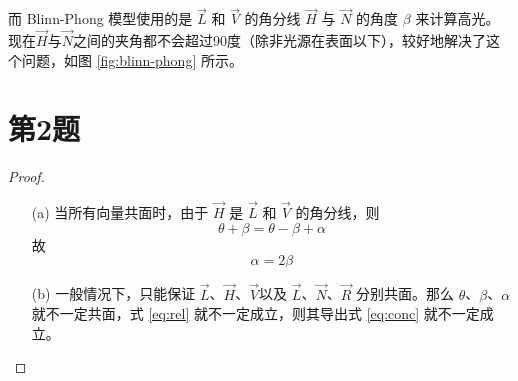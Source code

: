 \documentclass[math-font=newcm]{sjtuarticle}
\begin{document}
而 Blinn-Phong 模型使用的是 $\overrightarrow{L}$ 和 $\overrightarrow{V}$ 的角分线 $\overrightarrow{H}$ 与 $\overrightarrow{N}$ 的角度 $\beta$ 来计算高光。现在$\overrightarrow{H}$与$\overrightarrow{N}$之间的夹角都不会超过90度（除非光源在表面以下），较好地解决了这个问题，如图 \ref{fig:blinn-phong} 所示。

\section{第2题}

\begin{proof}
    \begin{itemize}
        \item[(a)] 当所有向量共面时，由于 $\overrightarrow{H}$ 是 $\overrightarrow{L}$ 和 $\overrightarrow{V}$ 的角分线，则
        \begin{equation}\label{eq:rel}
            \theta+\beta = \theta-\beta+\alpha
        \end{equation}
        故
        \begin{equation}\label{eq:conc}
            \alpha=2\beta
        \end{equation}
        \item[(b)] 一般情况下，只能保证 $\overrightarrow{L}$、$\overrightarrow{H}$、$\overrightarrow{V}$以及 $\overrightarrow{L}$、$\overrightarrow{N}$、$\overrightarrow{R}$ 分别共面。那么 $\theta$、$\beta$、$\alpha$ 就不一定共面，式 \eqref{eq:rel} 就不一定成立，则其导出式 \eqref{eq:conc} 就不一定成立。
    \end{itemize}
\end{proof}
\end{document}

